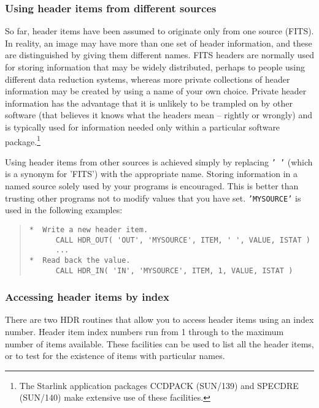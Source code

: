 \documentclass[twoside,11pt]{article}
\newcommand{\xref}[3]{#1}
\renewcommand{\_}{\texttt{\symbol{95}}}
\newcommand{\myverb}[1]{{\texttt{#1}}}
\newenvironment{code}{\begin{small} \begin{quote}}
                     {\end{quote} \end{small}}
\begin{document}
\subsubsection{Using \label{IMGNAMEDEXTENSIONS}header items from different sources}
So far, header items have been assumed to originate only from one
source (FITS). In reality, an image may have more than one
set of header information, and these are distinguished by giving them
different names. FITS headers are normally used for storing
information that may be widely distributed, perhaps to people using
different data reduction systems, whereas more private collections of
header information may be created by using a name of your own
choice. Private header information has the advantage that it is
unlikely to be trampled on by other software (that believes it knows
what the headers mean -- rightly or wrongly) and is typically used for
information needed only within a particular software
package.\footnote{The Starlink application packages CCDPACK
(\xref{SUN/139}{sun139}{}) and SPECDRE (\xref{SUN/140}{sun140}{}) make
extensive use of these facilities.}

Using header items from other sources is achieved simply by replacing
\myverb{' '} (which is a synonym for 'FITS') with the appropriate
name.  Storing information in a named source solely used by your
programs is encouraged. This is better than trusting other programs
not to modify values that you have set. \myverb{'MYSOURCE'} is used in
the following examples:
\begin{code}
\begin{verbatim}
*  Write a new header item.
      CALL HDR_OUT( 'OUT', 'MYSOURCE', ITEM, ' ', VALUE, ISTAT )
      ...
*  Read back the value.
      CALL HDR_IN( 'IN', 'MYSOURCE', ITEM, 1, VALUE, ISTAT )
\end{verbatim}
\end{code}

\subsubsection{Accessing header items by index \label{HDRINDEXING}}
There are two HDR routines that allow you to access header items using
an index number. Header item index numbers run from 1 through to the
maximum number of items available. These facilities can be used to
list all the header items, or to test for the existence of items with
particular names.
\end{document}
